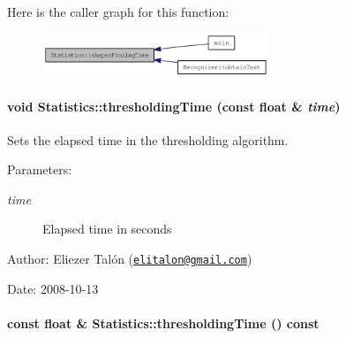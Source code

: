 Here is the caller graph for this function:\nopagebreak
\begin{figure}[H]
\begin{center}
\leavevmode
\includegraphics[width=192pt]{class_statistics_cdb8852bc99d12a619d130ae2e6948ee_icgraph}
\end{center}
\end{figure}
\hypertarget{class_statistics_97e33cf2670cb908646fe01b8f1d719a}{
\paragraph[{thresholdingTime}]{\setlength{\rightskip}{0pt plus 5cm}void Statistics::thresholdingTime (const float \& {\em time})}\hfill}
\label{class_statistics_97e33cf2670cb908646fe01b8f1d719a}


Sets the elapsed time in the thresholding algorithm. 

\begin{Desc}
\item[Parameters:]
\begin{description}
\item[{\em time}]Elapsed time in seconds\end{description}
\end{Desc}
\begin{Desc}
\item[Author:]Eliezer Talón (\href{mailto:elitalon@gmail.com}{\tt elitalon@gmail.com}) \end{Desc}
\begin{Desc}
\item[Date:]2008-10-13 \end{Desc}
\hypertarget{class_statistics_79a7c11e89528f21b663153c2636216a}{
\paragraph[{thresholdingTime}]{\setlength{\rightskip}{0pt plus 5cm}const float \& Statistics::thresholdingTime () const}\hfill}
\label{class_statistics_79a7c11e89528f21b663153c2636216a}


